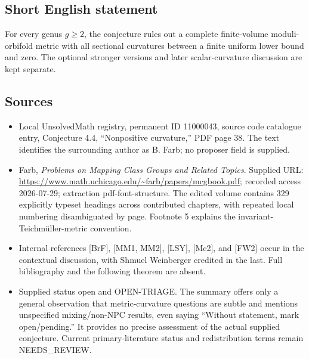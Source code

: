 \documentclass[11pt]{article}
\begin{document}
\subsection{Short English statement}
For every genus \(g\geq2\), the conjecture rules out a complete finite-volume moduli-orbifold metric with all sectional curvatures between a finite uniform lower bound and zero. The optional stronger versions and later scalar-curvature discussion are kept separate.
\subsection{Sources}
\begin{itemize}
\item Local UnsolvedMath registry, permanent ID 11000043, source code catalogue entry, Conjecture 4.4, ``Nonpositive curvature,'' PDF page 38. The text identifies the surrounding author as B. Farb; no proposer field is supplied.
\item Farb, \emph{Problems on Mapping Class Groups and Related Topics}. Supplied URL: \url{https://www.math.uchicago.edu/~farb/papers/mcgbook.pdf}; recorded access 2026-07-29; extraction pdf-font-structure. The edited volume contains 329 explicitly typeset headings across contributed chapters, with repeated local numbering disambiguated by page. Footnote 5 explains the invariant-Teichm\"uller-metric convention.
\item Internal references [BrF], [MM1, MM2], [LSY], [Mc2], and [FW2] occur in the contextual discussion, with Shmuel Weinberger credited in the last. Full bibliography and the following theorem are absent.
\item Supplied status open and OPEN-TRIAGE. The summary offers only a general observation that metric-curvature questions are subtle and mentions unspecified mixing/non-NPC results, even saying ``Without statement, mark open/pending.'' It provides no precise assessment of the actual supplied conjecture. Current primary-literature status and redistribution terms remain NEEDS\_REVIEW.
\end{itemize}
\end{document}
